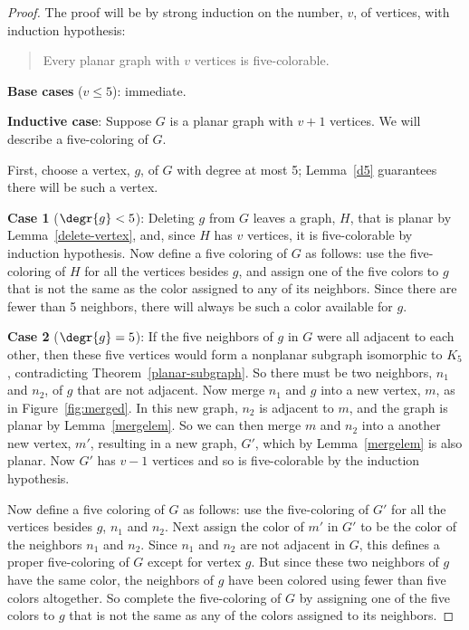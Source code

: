 \begin{proof}
The proof will be by strong induction on the number, $v$, of vertices, with
induction hypothesis:
\begin{quote}
Every planar graph with $v$ vertices is five-colorable.
\end{quote}

\textbf{Base cases} ($v \leq 5$): immediate.

\textbf{Inductive case}: Suppose $G$ is a planar graph with $v+1$
vertices.  We will describe a five-coloring of $G$.

First, choose a vertex, $g$, of $G$ with degree at most 5; Lemma~\ref{d5}
guarantees there will be such a vertex.

\textbf{Case 1} ($\degr{g}<5$): Deleting $g$ from $G$ leaves a graph, $H$,
that is planar by Lemma~\ref{delete-vertex}, and, since $H$ has $v$ vertices,
it is five-colorable by induction hypothesis.  Now define a five coloring
of $G$ as follows: use the five-coloring of $H$ for all the vertices besides
$g$, and assign one of the five colors to $g$ that is not the same as the
color assigned to any of its neighbors.  Since there are fewer than 5
neighbors, there will always be such a color available for $g$.

\textbf{Case 2} ($\degr{g}=5$): If the five neighbors of $g$ in $G$ were
all adjacent to each other, then these five vertices would form a
nonplanar subgraph isomorphic to $K_5$, contradicting
Theorem~\ref{planar-subgraph}.  So there must be two neighbors, $n_1$ and
$n_2$, of $g$ that are not adjacent.  Now merge $n_1$ and $g$ into a new
vertex, $m$, as in Figure~\ref{fig:merged}.  In this new graph, $n_2$ is
adjacent to $m$, and the graph is planar by Lemma~\ref{mergelem}.  So we
can then merge $m$ and $n_2$ into a another new vertex, $m'$, resulting in
a new graph, $G'$, which by Lemma~\ref{mergelem} is also planar.  Now $G'$
has $v-1$ vertices and so is five-colorable by the induction hypothesis.

Now define a five coloring of $G$ as follows: use the five-coloring of $G'$
for all the vertices besides $g$, $n_1$ and $n_2$.  Next assign the color
of $m'$ in $G'$ to be the color of the neighbors $n_1$ and $n_2$.  Since
$n_1$ and $n_2$ are not adjacent in $G$, this defines a proper
five-coloring of $G$ except for vertex $g$.  But since these two neighbors
of $g$ have the same color, the neighbors of $g$ have been colored using
fewer than five colors altogether.  So complete the five-coloring of $G$ by
assigning one of the five colors to $g$ that is not the same as any of the
colors assigned to its neighbors.

\end{proof}


